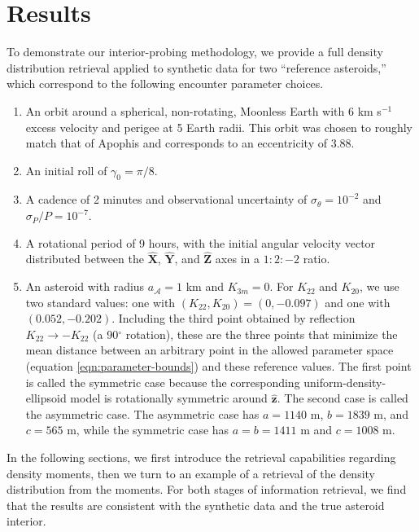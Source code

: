 \documentclass[fleqn,usenatbib]{mnras}
\newcommand{\unit}[1]{\bm{\hat{#1}}}
\begin{document}
\section{Results}
\label{sec:results}

To demonstrate our interior-probing methodology, we provide a full density distribution retrieval applied to synthetic data for two ``reference asteroids,'' which correspond to the following encounter parameter choices.

\begin{enumerate}
  \item An orbit around a spherical, non-rotating, Moonless Earth with $6$ km s$^{-1}$ excess velocity and perigee at 5 Earth radii. This orbit was chosen to roughly match that of Apophis and corresponds to an eccentricity of 3.88. 
  \item An initial roll of $\gamma_0=\pi/8$.
  \item A cadence of 2 minutes and observational uncertainty of $\sigma_\theta = 10^{-2}$ and $\sigma_P / P = 10^{-7}$.
  \item A rotational period of 9 hours, with the initial angular velocity vector distributed between the $\unit X$, $\unit Y$, and $\unit Z$ axes in a $1:2:-2$ ratio.
  \item An asteroid with radius $a_\mathcal{A} = 1$ km and $K_{3m}=0$. For $K_{22}$ and $K_{20}$, we use two standard values: one with $(K_{22}, K_{20}) = (0, -0.097)$ and one with $(0.052, -0.202)$. Including the third point obtained by reflection $K_{22}\rightarrow -K_{22}$ (a 90$^\circ$ rotation), these are the three points that minimize the mean distance between an arbitrary point in the allowed parameter space (equation \ref{eqn:parameter-bounds}) and these reference values. The first point is called the symmetric case because the corresponding uniform-density-ellipsoid model is rotationally symmetric around $\unit z$. The second case is called the asymmetric case. The asymmetric case has $a=1140$ m, $b=1839$ m, and $c=565$ m, while the symmetric case has $a=b=1411$ m and $c=1008$ m.
\end{enumerate}

In the following sections, we first introduce the retrieval capabilities regarding density moments, then we turn to an example of a retrieval of the density distribution from the moments. For both stages of information retrieval, we find that the results are consistent with the synthetic data and the true asteroid interior.
\end{document}
